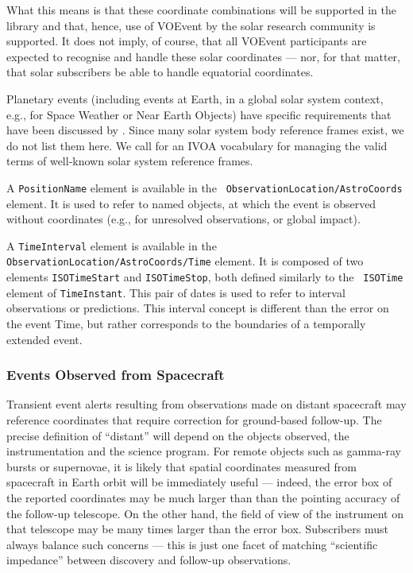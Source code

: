 \documentclass[11pt,a4paper]{ivoa}
\begin{document}
What this means is that these coordinate combinations will be supported in the
library and that, hence, use of VOEvent by the solar research community is
supported. It does not imply, of course, that all VOEvent participants are
expected to recognise and handle these solar coordinates --- nor, for that
matter, that solar subscribers be able to handle equatorial coordinates.

Planetary events (including events at Earth, in a global solar system context,
e.g., for Space Weather or Near Earth Objects) have specific requirements that
have been discussed by \citet{2018arXiv181112680C}. Since many solar system body
reference frames exist, we do not list them here. We call for an IVOA vocabulary
for managing the valid terms of well-known solar system reference frames.

A {\tt PositionName} element is available in the {\tt
ObservationLocation/AstroCoords} element. It is used to refer to named objects,
at which the event is observed without coordinates (e.g., for unresolved
observations, or global impact).

A {\tt TimeInterval} element is available in the {\tt
ObservationLocation/AstroCoords/Time} element. It is composed of two elements
{\tt ISOTimeStart} and {\tt ISOTimeStop}, both defined similarly to the {\tt
ISOTime} element of {\tt TimeInstant}. This pair of dates is used to refer to
interval observations or predictions. This interval concept is different than
the error on the event Time, but rather corresponds to the boundaries of a
temporally extended event.


\subsubsection{Events Observed from Spacecraft}
\label{sec:3.4.5}
Transient event alerts resulting from observations made on distant spacecraft
may reference coordinates that require correction for ground-based follow-up.
The precise definition of ``distant'' will depend on the objects observed, the
instrumentation and the science program. For remote objects such as gamma-ray
bursts or supernovae, it is likely that spatial coordinates measured from
spacecraft in Earth orbit will be immediately useful --- indeed, the error box
of the reported coordinates may be much larger than than the pointing accuracy
of the follow-up telescope. On the other hand, the field of view of the
instrument on that telescope may be many times larger than the error box.
Subscribers must always balance such concerns --- this is just one facet of
matching ``scientific impedance'' between discovery and follow-up observations.
\end{document}
